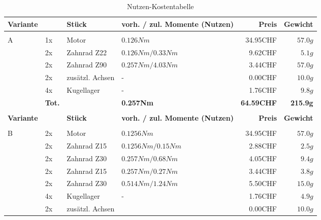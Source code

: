     \begin{longtable}{p{0.5cm}p{0.8cm}lp{3cm}rr}
        \caption{Nutzen-Kostentabelle ...}
        \label{tab:addlabel}
        \endfoot
        \caption{Nutzen-Kostentabelle}
        \endlastfoot
        \textbf{Variante}& & \textbf{Stück} & \textbf{vorh. / zul. Momente (Nutzen)} & \textbf{Preis} & \textbf{Gewicht} \\\hline
          &       &                 &                      &          &  \\
        \multirow{6}[2]{*}{A}
          & 1x    & Motor           & $0.126 Nm$           & 34.95CHF & $57.0 g$ \\
          & 2x    & Zahnrad Z22     & $0.126 Nm / 0.33 Nm$ &  9.62CHF & $5.1 g$  \\
          & 2x    & Zahnrad Z90     & $0.257 Nm / 4.03 Nm$ &  3.44CHF & $57.0 g$ \\
          & 2x    & zusätzl. Achsen & -                    &  0.00CHF & $10.0 g$ \\
          & 4x    & Kugellager      & -                    &  1.76CHF & $9.8 g$  \\
          & \textbf{Tot.} &  & \textbf{0.257Nm} & \textbf{64.59CHF} & \textbf{215.9g} \\
          &       &                 &                      &          &  \\
          \newpage
        \textbf{Variante}& & \textbf{Stück} & \textbf{vorh. / zul. Momente (Nutzen)} & \textbf{Preis} & \textbf{Gewicht} \\\hline
          &       &                 &                      &          &  \\
        \multirow{8}[2]{*}{B}
          & 2x    & Motor           & $0.1256 Nm$          & 34.95CHF & $57.0 g$ \\
          & 2x    & Zahnrad Z15     & $0.1256 Nm / 0.15 Nm$& 2.88CHF  & $2.5 g$  \\
          & 2x    & Zahnrad Z30     & $0.257 Nm / 0.68 Nm$ & 4.05CHF  & $9.4 g$  \\
          & 2x    & Zahnrad Z15     & $0.257 Nm / 0.27 Nm$ & 3.44CHF  & $3.8 g$  \\
          & 2x    & Zahnrad Z30     & $0.514 Nm / 1.24 Nm$ & 5.50CHF  & $15.0 g$ \\
          & 4x    & Kugellager      & -                    & 1.76CHF  & $4.9 g$  \\
          & 2x    & zusätzl. Achsen &                      & 0.00CHF  & $10.0 g$ \\

\end{longtable}
